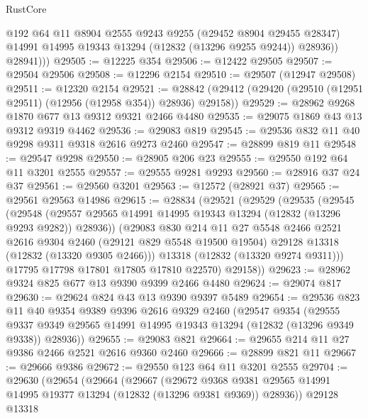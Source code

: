 \begin{lexlean}{RustCore}
\begin{coremodule}
              @192
              @64
              @11
              @8904
              @2555
              @9243
              @9255
              (@29452 @8904 @29455 @28347)
              @14991
              @14995
              @19343
              @13294
              (@12832 (@13296 @9255 @9244))
              @28936))
          @28941)))
@29505 := @12225 @354
@29506 := @12422 @29505
@29507 := @29504 @29506
@29508 := @12296 @2154
@29510 := @29507 (@12947 @29508)
@29511 := @12320 @2154
@29521 := @28842 (@29412 (@29420 (@29510 (@12951 @29511) (@12956 (@12958 @354)) @28936) @29158))
@29529 := @28962 @9268 @1870 @677 @13 @9312 @9321 @2466 @4480
@29535 := @29075 @1869 @43 @13 @9312 @9319 @4462
@29536 := @29083 @819
@29545 := @29536 @832 @11 @40 @9298 @9311 @9318 @2616 @9273 @2460
@29547 := @28899 @819 @11
@29548 := @29547 @9298
@29550 := @28905 @206 @23
@29555 := @29550 @192 @64 @11 @3201 @2555
@29557 := @29555 @9281 @9293
@29560 := @28916 @37 @24 @37
@29561 := @29560 @3201
@29563 := @12572 (@28921 @37)
@29565 := @29561 @29563 @14986
@29615 := @28834
    (@29521
      (@29529
        (@29535
          (@29545
            (@29548
              (@29557 @29565 @14991 @14995 @19343 @13294 (@12832 (@13296 @9293 @9282)) @28936))
            (@29083
              @830
              @214
              @11
              @27
              @5548
              @2466
              @2521
              @2616
              @9304
              @2460
              (@29121 @829 @5548 @19500 @19504)
              @29128
              @13318
              (@12832 (@13320 @9305 @2466)))
            @13318
            (@12832 (@13320 @9274 @9311)))
          @17795
          @17798
          @17801
          @17805
          @17810
          @22570)
        @29158))
@29623 := @28962 @9324 @825 @677 @13 @9390 @9399 @2466 @4480
@29624 := @29074 @817
@29630 := @29624 @824 @43 @13 @9390 @9397 @5489
@29654 := @29536
    @823
    @11
    @40
    @9354
    @9389
    @9396
    @2616
    @9329
    @2460
    (@29547
      @9354
      (@29555 @9337 @9349 @29565 @14991 @14995 @19343 @13294 (@12832 (@13296 @9349 @9338)) @28936))
@29655 := @29083 @821
@29664 := @29655 @214 @11 @27 @9386 @2466 @2521 @2616 @9360 @2460
@29666 := @28899 @821 @11
@29667 := @29666 @9386
@29672 := @29550 @123 @64 @11 @3201 @2555
@29704 := @29630
    (@29654
      (@29664
        (@29667
          (@29672
            @9368
            @9381
            @29565
            @14991
            @14995
            @19377
            @13294
            (@12832 (@13296 @9381 @9369))
            @28936))
        @29128
        @13318

\end{coremodule}
\end{lexlean}
